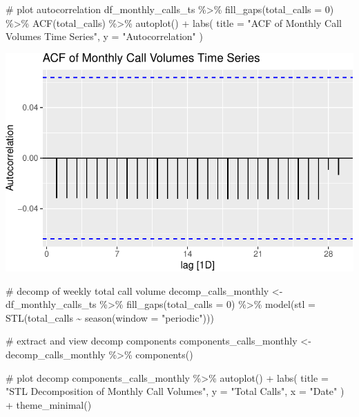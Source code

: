 \documentclass[
  letterpaper,
  DIV=11,
  numbers=noendperiod]{scrartcl}
\newenvironment{Shaded}{\begin{snugshade}}{\end{snugshade}}
\newcommand{\AttributeTok}[1]{\textcolor[rgb]{0.40,0.45,0.13}{#1}}
\newcommand{\CommentTok}[1]{\textcolor[rgb]{0.37,0.37,0.37}{#1}}
\newcommand{\DecValTok}[1]{\textcolor[rgb]{0.68,0.00,0.00}{#1}}
\newcommand{\FunctionTok}[1]{\textcolor[rgb]{0.28,0.35,0.67}{#1}}
\newcommand{\NormalTok}[1]{\textcolor[rgb]{0.00,0.23,0.31}{#1}}
\newcommand{\OtherTok}[1]{\textcolor[rgb]{0.00,0.23,0.31}{#1}}
\newcommand{\SpecialCharTok}[1]{\textcolor[rgb]{0.37,0.37,0.37}{#1}}
\newcommand{\StringTok}[1]{\textcolor[rgb]{0.13,0.47,0.30}{#1}}
\begin{document}
\begin{Shaded}
\begin{Highlighting}[]
\CommentTok{\# plot autocorrelation}
\NormalTok{df\_monthly\_calls\_ts }\SpecialCharTok{\%\textgreater{}\%}
  \FunctionTok{fill\_gaps}\NormalTok{(}\AttributeTok{total\_calls =} \DecValTok{0}\NormalTok{) }\SpecialCharTok{\%\textgreater{}\%}
  \FunctionTok{ACF}\NormalTok{(total\_calls) }\SpecialCharTok{\%\textgreater{}\%}
  \FunctionTok{autoplot}\NormalTok{() }\SpecialCharTok{+} 
  \FunctionTok{labs}\NormalTok{(}
    \AttributeTok{title =} \StringTok{"ACF of Monthly Call Volumes Time Series"}\NormalTok{,}
    \AttributeTok{y =} \StringTok{"Autocorrelation"}
\NormalTok{  )}
\end{Highlighting}
\end{Shaded}

\includegraphics{final_proj_group1_files/figure-pdf/unnamed-chunk-1-2.pdf}

\begin{Shaded}
\begin{Highlighting}[]
\CommentTok{\# decomp of weekly total call volume}
\NormalTok{decomp\_calls\_monthly }\OtherTok{\textless{}{-}}\NormalTok{ df\_monthly\_calls\_ts }\SpecialCharTok{\%\textgreater{}\%}
  \FunctionTok{fill\_gaps}\NormalTok{(}\AttributeTok{total\_calls =} \DecValTok{0}\NormalTok{) }\SpecialCharTok{\%\textgreater{}\%}
  \FunctionTok{model}\NormalTok{(}\AttributeTok{stl =} \FunctionTok{STL}\NormalTok{(total\_calls }\SpecialCharTok{\textasciitilde{}} \FunctionTok{season}\NormalTok{(}\AttributeTok{window =} \StringTok{"periodic"}\NormalTok{)))}

\CommentTok{\# extract and view decomp components}
\NormalTok{components\_calls\_monthly }\OtherTok{\textless{}{-}}\NormalTok{ decomp\_calls\_monthly }\SpecialCharTok{\%\textgreater{}\%}
  \FunctionTok{components}\NormalTok{()}

\CommentTok{\# plot decomp}
\NormalTok{components\_calls\_monthly }\SpecialCharTok{\%\textgreater{}\%}
  \FunctionTok{autoplot}\NormalTok{() }\SpecialCharTok{+}
  \FunctionTok{labs}\NormalTok{(}
    \AttributeTok{title =} \StringTok{"STL Decomposition of Monthly Call Volumes"}\NormalTok{, }
    \AttributeTok{y =} \StringTok{"Total Calls"}\NormalTok{, }
    \AttributeTok{x =} \StringTok{"Date"}
\NormalTok{  ) }\SpecialCharTok{+}
  \FunctionTok{theme\_minimal}\NormalTok{()}
\end{Highlighting}
\end{Shaded}
\end{document}
